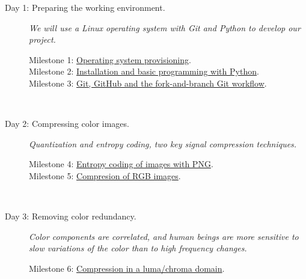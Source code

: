 \begin{description}
\item [Day 1: {\normalfont Preparing the working
    environment.}] \emph{We will use a Linux operating system with
  Git and Python to develop our project.}
  \begin{description}
  \item [Milestone 1: {\normalfont \href{https://sistemas-multimedia.github.io/milestones/01-provisioning/}{Operating system provisioning}.}]
  \item [Milestone 2: {\normalfont \href{https://sistemas-multimedia.github.io/milestones/02-python/}{Installation and basic programming with Python}.}]
  \item [Milestone 3: {\normalfont \href{https://sistemas-multimedia.github.io/milestones/03-git/}{Git, GitHub and the fork-and-branch Git workflow}.}]
  \end{description}
  ~\newline

\item [Day 2: {\normalfont Compressing color images.}] \emph{Quantization and entropy coding, two key signal compression techniques.}
  \begin{description}
  \item [Milestone 4: {\normalfont \href{https://sistemas-multimedia.github.io/milestones/04-PNG/}{Entropy coding of images with PNG}.}]
  \item [Milestone 5: {\normalfont \href{https://sistemas-multimedia.github.io/milestones/05-RGB_compression/}{Compresion of RGB images}.}]
  \end{description}
  ~\newline

\item [Day 3: {\normalfont Removing color redundancy.}] \emph{Color
    components are correlated, and human beings are more sensitive to
    slow variations of the color than to high frequency changes.}
  \begin{description}
   \item [Milestone 6: {\normalfont \href{https://sistemas-multimedia.github.io/milestones/06-YUV_compression/}{Compression in a luma/chroma domain}.}]
  \end{description}
  ~\newline


\end{description}
